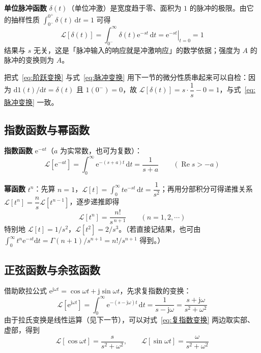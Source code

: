 \textbf{单位脉冲函数} $\delta(t)$（单位冲激）是宽度趋于零、面积为 $1$ 的脉冲的极限。由它的抽样性质 $\int_{0^{-}}^{0^{+}}\delta(t)\,\mathrm{d}t=1$ 可得
\begin{equation}
\mathcal{L}\left[\delta(t)\right]=\int_{0^{-}}^{\infty}\delta(t)\mathrm{e}^{-st}\,\mathrm{d}t=\left.\mathrm{e}^{-st}\right|_{t=0}=1
\label{eq:脉冲变换}
\end{equation}
结果与 $s$ 无关，这是「脉冲输入的响应就是冲激响应」的数学依据；强度为 $A$ 的脉冲的变换则为 $A$。

\begin{remark}
把式~\eqref{eq:阶跃变换} 与式~\eqref{eq:脉冲变换} 用下一节的微分性质串起来可以自检：因为 $\mathrm{d}1(t)/\mathrm{d}t=\delta(t)$ 且 $1(0^{-})=0$，故 $\mathcal{L}\left[\delta(t)\right]=s\cdot\dfrac{1}{s}-0=1$，与式~\eqref{eq:脉冲变换} 一致。
\end{remark}

\subsection{指数函数与幂函数}

\textbf{指数函数} $\mathrm{e}^{-at}$（$a$ 为实常数，也可为复数）：
\begin{equation}
\mathcal{L}\left[\mathrm{e}^{-at}\right]=\int_{0}^{\infty}\mathrm{e}^{-(s+a)t}\,\mathrm{d}t=\frac{1}{s+a}
\qquad(\operatorname{Re}s>-a)
\label{eq:指数变换}
\end{equation}

\textbf{幂函数} $t^{n}$：先算 $n=1$，$\mathcal{L}\left[t\right]=\int_{0}^{\infty}t\mathrm{e}^{-st}\,\mathrm{d}t=\dfrac{1}{s^{2}}$；再用分部积分可得递推关系 $\mathcal{L}\left[t^{n}\right]=\dfrac{n}{s}\mathcal{L}\left[t^{n-1}\right]$，逐步递推即得
\begin{equation}
\mathcal{L}\left[t^{n}\right]=\frac{n!}{s^{\,n+1}}\qquad(n=1,2,\cdots)
\label{eq:幂函数变换}
\end{equation}
特别地 $\mathcal{L}[t]=1/s^{2}$，$\mathcal{L}[t^{2}]=2/s^{3}$。（若直接记结果，也可由 $\int_{0}^{\infty}t^{n}\mathrm{e}^{-st}\mathrm{d}t=\Gamma(n+1)/s^{n+1}=n!/s^{n+1}$ 得到。）

\subsection{正弦函数与余弦函数}

借助欧拉公式 $\mathrm{e}^{\mathrm{j}\omega t}=\cos\omega t+\mathrm{j}\sin\omega t$，先求复指数的变换：
\begin{equation}
\mathcal{L}\left[\mathrm{e}^{\mathrm{j}\omega t}\right]=\int_{0}^{\infty}\mathrm{e}^{-(s-\mathrm{j}\omega)t}\,\mathrm{d}t=\frac{1}{s-\mathrm{j}\omega}=\frac{s+\mathrm{j}\omega}{s^{2}+\omega^{2}}
\label{eq:复指数变换}
\end{equation}
由于拉氏变换是线性运算（见下一节），可以对式~\eqref{eq:复指数变换} 两边取实部、虚部，得到
\begin{equation}
\mathcal{L}\left[\cos\omega t\right]=\frac{s}{s^{2}+\omega^{2}},\qquad
\mathcal{L}\left[\sin\omega t\right]=\frac{\omega}{s^{2}+\omega^{2}}
\label{eq:正余弦变换}
\end{equation}

